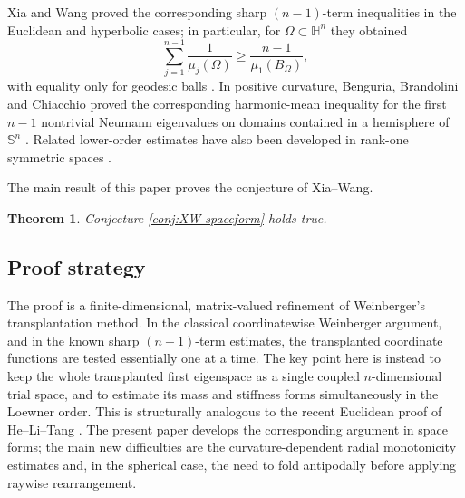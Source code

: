 \documentclass[11pt]{amsart}
\newtheorem{theorem}{Theorem}[section]
\theoremstyle{remark}
\newtheorem{remark}[theorem]{Remark}
\newcommand{\HH}{\mathbb H}
\newcommand{\Sn}{\mathbb S}
\begin{document}
Xia and Wang proved the corresponding sharp $(n-1)$-term inequalities in the Euclidean and hyperbolic cases; in particular, for $\Omega\subset\HH^n$ they obtained
$$
        \sum_{j=1}^{n-1}\frac1{\mu_j(\Omega)}
        \ge
        \frac{n-1}{\mu_1(B_\Omega)},
$$
with equality only for geodesic balls \cite{XiaWang}.  In positive curvature, Benguria, Brandolini and Chiacchio proved the corresponding harmonic-mean inequality for the first $n-1$ nontrivial Neumann eigenvalues on domains contained in a hemisphere of $\Sn^n$ \cite{BBC}.  Related lower-order estimates have also been developed in rank-one symmetric spaces \cite{MengWang}.

The main result of this paper proves the conjecture of Xia--Wang.

\begin{theorem}\label{thm:main}
Conjecture \ref{conj:XW-spaceform} holds true.  
\end{theorem}


\subsection{Proof strategy}
The proof is a finite-dimensional, matrix-valued refinement of
Weinberger's transplantation method.  In the classical coordinatewise
Weinberger argument, and in the known sharp $(n-1)$-term estimates, the
transplanted coordinate functions are tested essentially one at a time.  The
key point here is instead to keep the whole transplanted first eigenspace as
a single coupled $n$-dimensional trial space, and to estimate its mass and
stiffness forms simultaneously in the Loewner order.  This is structurally
analogous to the recent Euclidean proof of He--Li--Tang \cite{HeLiTang}.  The
present paper develops the corresponding argument in space forms; the main
new difficulties are the curvature-dependent radial monotonicity estimates
and, in the spherical case, the need to fold antipodally before applying
raywise rearrangement.
\end{document}
